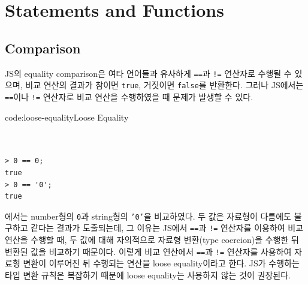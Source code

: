 \section{Statements and Functions} \label{sect:statements-and-functions}

\subsection*{Comparison}

JS의 equality comparison은 여타 언어들과 유사하게 \texttt{==}과 \texttt{!=} 연산자로 수행될 수 있으며, 비교 연산의 결과가 참이면 \texttt{true}, 거짓이면 \texttt{false}를 반환한다. 그러나 JS에서는 \texttt{==}이나 \texttt{!=} 연산자로 비교 연산을 수행하였을 때 문제가 발생할 수 있다.

\begin{codeenv}{code:loose-equality}{Loose Equality}\begin{verbatim}


> 0 == 0;
true
> 0 == '0';
true
\end{verbatim}
\end{codeenv}

에서는 number형의 \texttt{0}과 string형의 \texttt{'0'}을 비교하였다. 두 값은 자료형이 다름에도 불구하고 같다는 결과가 도출되는데, 그 이유는 JS에서 \texttt{==}과 \texttt{!=} 연산자를 이용하여 비교 연산을 수행할 때, 두 값에 대해 자의적으로 자료형 변환(type coercion)을 수행한 뒤 변환된 값을 비교하기 때문이다. 이렇게 비교 연산에서 \texttt{==}과 \texttt{!=} 연산자를 사용하여 자료형 변환이 이루어진 뒤 수행되는 연산을 loose equality이라고 한다. JS가 수행하는 타입 변환 규칙은 복잡하기 때문에 loose equality는 사용하지 않는 것이 권장된다.

